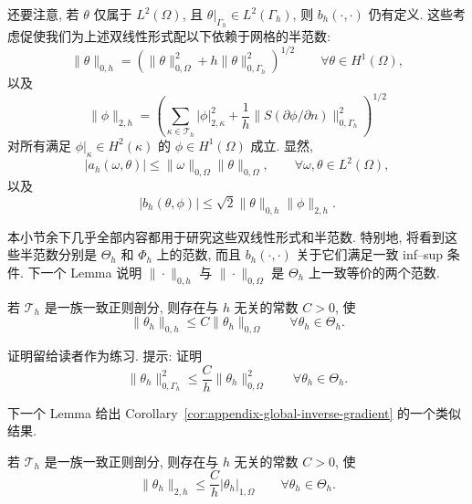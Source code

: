 还要注意, 若 $\theta$ 仅属于 $L^2(\Omega)$,
且 $\theta|_{\Gamma_h}\in L^2(\Gamma_h)$,
则 $b_h(\cdot,\cdot)$ 仍有定义.
这些考虑促使我们为上述双线性形式配以下依赖于网格的半范数:
\begin{equation}\label{eq:incompressible-sfvp-mesh-norm-zero}
\|\theta\|_{0,h}
=\left(\|\theta\|_{0,\Omega}^2
+h\|\theta\|_{0,\Gamma_h}^2\right)^{1/2}
\qquad\forall\theta\in H^1(\Omega),
\end{equation}
以及
\begin{equation}\label{eq:incompressible-sfvp-mesh-norm-two}
\|\phi\|_{2,h}
=\left(
\sum_{\kappa\in\mathcal T_h}|\phi|_{2,\kappa}^2
+\frac1h\|S(\partial\phi/\partial n)\|_{0,\Gamma_h}^2
\right)^{1/2}
\end{equation}
对所有满足 $\phi|_\kappa\in H^2(\kappa)$ 的
$\phi\in H^1(\Omega)$ 成立.
显然,
\[
|a_h(\omega,\theta)|
\leq\|\omega\|_{0,\Omega}\|\theta\|_{0,\Omega},
\qquad
\forall\omega,\theta\in L^2(\Omega),
\]
以及
\[
|b_h(\theta,\phi)|
\leq\sqrt2\|\theta\|_{0,h}\|\phi\|_{2,h}.
\]

本小节余下几乎全部内容都用于研究这些双线性形式和半范数.
特别地, 将看到这些半范数分别是 $\Theta_h$ 和 $\Phi_h$ 上的范数,
而且 $b_h(\cdot,\cdot)$ 关于它们满足一致 inf--sup 条件.
下一个 Lemma 说明 $\|\cdot\|_{0,h}$ 与 $\|\cdot\|_{0,\Omega}$
是 $\Theta_h$ 上一致等价的两个范数.

\begin{Lemma}\label{lem:incompressible-sfvp-mesh-zero-norm-equivalence}
若 $\mathcal T_h$ 是一族一致正则剖分, 则存在与 $h$ 无关的常数
$C>0$, 使
\begin{equation}\label{eq:incompressible-sfvp-mesh-zero-norm-equivalence}
\|\theta_h\|_{0,h}
\leq C\|\theta_h\|_{0,\Omega}
\qquad\forall\theta_h\in\Theta_h.
\end{equation}
\end{Lemma}

证明留给读者作为练习. 提示: 证明
\[
\|\theta_h\|_{0,\Gamma_h}^2
\leq\frac Ch\|\theta_h\|_{0,\Omega}^2
\qquad\forall\theta_h\in\Theta_h.
\]

下一个 Lemma 给出 Corollary~\ref{cor:appendix-global-inverse-gradient}
的一个类似结果.

\begin{Lemma}\label{lem:incompressible-sfvp-mesh-two-norm-inverse}
若 $\mathcal T_h$ 是一族一致正则剖分, 则存在与 $h$ 无关的常数
$C>0$, 使
\begin{equation}\label{eq:incompressible-sfvp-mesh-two-norm-inverse}
\|\theta_h\|_{2,h}
\leq\frac Ch|\theta_h|_{1,\Omega}
\qquad\forall\theta_h\in\Theta_h.
\end{equation}
\end{Lemma}

